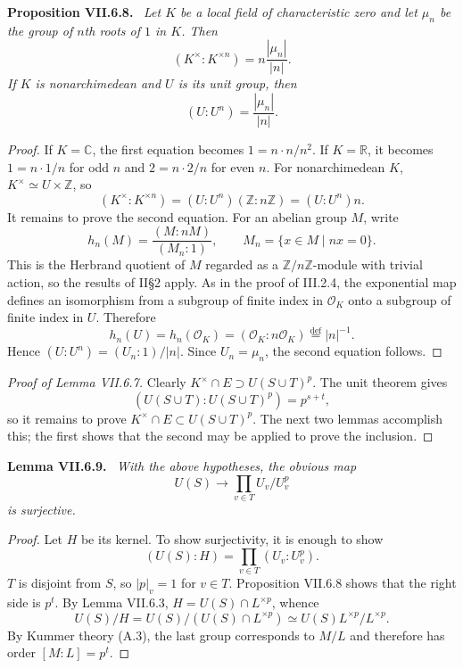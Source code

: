 \documentclass[11pt]{article}
\newenvironment{authorresult}[2]{\par\medskip\noindent\textbf{#1 VII.#2.}\ \itshape}{\par\medskip}
\begin{document}
\begin{authorresult}{Proposition}{6.8}
Let $K$ be a local field of characteristic zero and let $\mu_n$ be the group
of $n$th roots of $1$ in $K$. Then
\[
 (K^\times:K^{\times n})=n\frac{|\mu_n|}{|n|}.
\]
If $K$ is nonarchimedean and $U$ is its unit group, then
\[
 (U:U^n)=\frac{|\mu_n|}{|n|}.
\]
\end{authorresult}
\begin{proof}
If $K=\mathbb C$, the first equation becomes $1=n\cdot n/n^2$.
If $K=\mathbb R$, it becomes $1=n\cdot1/n$ for odd $n$ and
$2=n\cdot2/n$ for even $n$.
For nonarchimedean $K$, $K^\times\simeq U\times\mathbb Z$, so
\[
 (K^\times:K^{\times n})=(U:U^n)(\mathbb Z:n\mathbb Z)=(U:U^n)n.
\]
It remains to prove the second equation. For an abelian group $M$, write
\[
 h_n(M)=\frac{(M:nM)}{(M_n:1)},\qquad M_n=\{x\in M\mid nx=0\}.
\]
This is the Herbrand quotient of $M$ regarded as a $\mathbb Z/n\mathbb Z$-module
with trivial action, so the results of II\S2 apply.
As in the proof of III.2.4, the exponential map defines an isomorphism from
a subgroup of finite index in $\mathcal O_K$ onto a subgroup of finite
index in $U$. Therefore
\[
 h_n(U)=h_n(\mathcal O_K)=(\mathcal O_K:n\mathcal O_K)
 \overset{\mathrm{def}}=|n|^{-1}.
\]
Hence $(U:U^n)=(U_n:1)/|n|$. Since $U_n=\mu_n$, the second equation follows.
\end{proof}

\begin{proof}[Proof of Lemma VII.6.7]
Clearly $K^\times\cap E\supset U(S\cup T)^p$. The unit theorem gives
\[
 (U(S\cup T):U(S\cup T)^p)=p^{s+t},
\]
so it remains to prove $K^\times\cap E\subset U(S\cup T)^p$.
The next two lemmas accomplish this; the first shows that the second may
be applied to prove the inclusion.
\end{proof}

\begin{authorresult}{Lemma}{6.9}
With the above hypotheses, the obvious map
\[
 U(S)\longrightarrow\prod_{v\in T}U_v/U_v^p
\]
is surjective.
\end{authorresult}
\begin{proof}
Let $H$ be its kernel. To show surjectivity, it is enough to show
\[
 (U(S):H)=\prod_{v\in T}(U_v:U_v^p).
\]
$T$ is disjoint from $S$, so $|p|_v=1$ for $v\in T$.
Proposition VII.6.8 shows that the right side is $p^t$.
By Lemma VII.6.3, $H=U(S)\cap L^{\times p}$, whence
\[
 U(S)/H=U(S)/(U(S)\cap L^{\times p})
 \simeq U(S)L^{\times p}/L^{\times p}.
\]
By Kummer theory (A.3), the last group corresponds to $M/L$ and therefore
has order $[M:L]=p^t$.
\end{proof}
\end{document}
